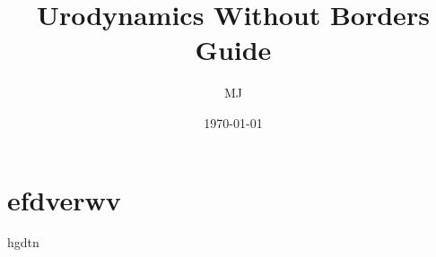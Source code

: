 \documentclass{article}
\begin{document}
\title{Urodynamics Without Borders Guide}
\author{MJ}
\date{\today}
\maketitle


\clearpage

\tableofcontents

\clearpage




\section{efdverwv}
hgdtn
\end{document}
